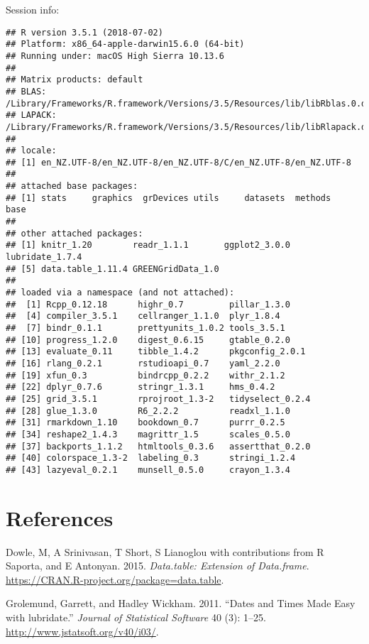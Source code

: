 \documentclass[]{article}
\theoremstyle{definition}
\theoremstyle{definition}
\theoremstyle{definition}
\theoremstyle{remark}
\begin{document}
Session info:

\begin{verbatim}
## R version 3.5.1 (2018-07-02)
## Platform: x86_64-apple-darwin15.6.0 (64-bit)
## Running under: macOS High Sierra 10.13.6
## 
## Matrix products: default
## BLAS: /Library/Frameworks/R.framework/Versions/3.5/Resources/lib/libRblas.0.dylib
## LAPACK: /Library/Frameworks/R.framework/Versions/3.5/Resources/lib/libRlapack.dylib
## 
## locale:
## [1] en_NZ.UTF-8/en_NZ.UTF-8/en_NZ.UTF-8/C/en_NZ.UTF-8/en_NZ.UTF-8
## 
## attached base packages:
## [1] stats     graphics  grDevices utils     datasets  methods   base     
## 
## other attached packages:
## [1] knitr_1.20        readr_1.1.1       ggplot2_3.0.0     lubridate_1.7.4  
## [5] data.table_1.11.4 GREENGridData_1.0
## 
## loaded via a namespace (and not attached):
##  [1] Rcpp_0.12.18      highr_0.7         pillar_1.3.0     
##  [4] compiler_3.5.1    cellranger_1.1.0  plyr_1.8.4       
##  [7] bindr_0.1.1       prettyunits_1.0.2 tools_3.5.1      
## [10] progress_1.2.0    digest_0.6.15     gtable_0.2.0     
## [13] evaluate_0.11     tibble_1.4.2      pkgconfig_2.0.1  
## [16] rlang_0.2.1       rstudioapi_0.7    yaml_2.2.0       
## [19] xfun_0.3          bindrcpp_0.2.2    withr_2.1.2      
## [22] dplyr_0.7.6       stringr_1.3.1     hms_0.4.2        
## [25] grid_3.5.1        rprojroot_1.3-2   tidyselect_0.2.4 
## [28] glue_1.3.0        R6_2.2.2          readxl_1.1.0     
## [31] rmarkdown_1.10    bookdown_0.7      purrr_0.2.5      
## [34] reshape2_1.4.3    magrittr_1.5      scales_0.5.0     
## [37] backports_1.1.2   htmltools_0.3.6   assertthat_0.2.0 
## [40] colorspace_1.3-2  labeling_0.3      stringi_1.2.4    
## [43] lazyeval_0.2.1    munsell_0.5.0     crayon_1.3.4
\end{verbatim}

\section*{References}\label{references}

\hypertarget{refs}{}
\hypertarget{ref-data.table}{}
Dowle, M, A Srinivasan, T Short, S Lianoglou with contributions from R
Saporta, and E Antonyan. 2015. \emph{Data.table: Extension of
Data.frame}. \url{https://CRAN.R-project.org/package=data.table}.

\hypertarget{ref-lubridate}{}
Grolemund, Garrett, and Hadley Wickham. 2011. ``Dates and Times Made
Easy with lubridate.'' \emph{Journal of Statistical Software} 40 (3):
1--25. \url{http://www.jstatsoft.org/v40/i03/}.
\end{document}
